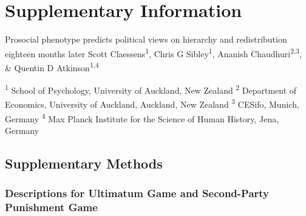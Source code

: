 \documentclass[
  man,floatsintext]{apa6}
\begin{document}
\endgroup
\newpage
\vspace*{60mm}

\renewcommand{\figurename}{Supplementary Figure}
\renewcommand{\tablename}{Supplementary Table}
\renewcommand{\thefigure}{\arabic{figure}} \setcounter{figure}{0}
\renewcommand{\thetable}{\arabic{table}} \setcounter{table}{0}
\renewcommand{\theequation}{\arabic{equation}} \setcounter{equation}{0}

\hypertarget{supplementary-information}{%
\section{\texorpdfstring{\textbf{Supplementary Information}}{Supplementary Information}}\label{supplementary-information}}

\setcounter{page}{1}
\centering

\noindent \footnotesize Prosocial phenotype predicts political views on hierarchy and redistribution eighteen months later \newline
\hspace*{8mm} \footnotesize Scott Claessens\textsuperscript{1}, Chris G Sibley\textsuperscript{1}, Ananish Chaudhuri\textsuperscript{2,3}, \& Quentin D Atkinson\textsuperscript{1,4} \newline

\raggedright

\noindent \footnotesize \textsuperscript{1} School of Psychology, University of Auckland, New Zealand \newline
\noindent \footnotesize \textsuperscript{2} Department of Economics, University of Auckland, Auckland, New Zealand \newline
\noindent \footnotesize \textsuperscript{3} CESifo, Munich, Germany \newline
\noindent \footnotesize \textsuperscript{4} Max Planck Institute for the Science of Human History, Jena, Germany \newline
\normalsize
\newpage

\hypertarget{supplementary-methods}{%
\subsection{Supplementary Methods}\label{supplementary-methods}}

\hypertarget{descriptions-for-ultimatum-game-and-second-party-punishment-game}{%
\subsubsection{Descriptions for Ultimatum Game and Second-Party Punishment Game}\label{descriptions-for-ultimatum-game-and-second-party-punishment-game}}
\end{document}
